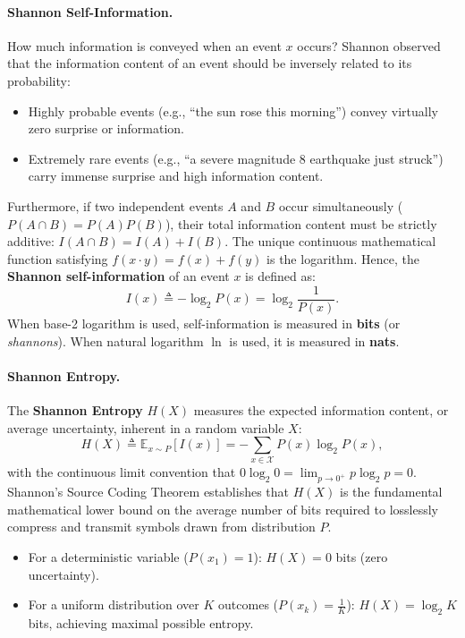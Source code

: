 \paragraph{Shannon Self-Information.}
How much information is conveyed when an event $x$ occurs? Shannon observed that the information content of an event should be inversely related to its probability:
\begin{itemize}[noitemsep]
  \item Highly probable events (e.g., ``the sun rose this morning'') convey virtually zero surprise or information.
  \item Extremely rare events (e.g., ``a severe magnitude 8 earthquake just struck'') carry immense surprise and high information content.
\end{itemize}
Furthermore, if two independent events $A$ and $B$ occur simultaneously ($P(A \cap B) = P(A)P(B)$), their total information content must be strictly additive: $I(A \cap B) = I(A) + I(B)$. The unique continuous mathematical function satisfying $f(x \cdot y) = f(x) + f(y)$ is the logarithm. Hence, the \textbf{Shannon self-information} of an event $x$ is defined as:
\begin{equation}
I(x) \triangleq -\log_2 P(x) = \log_2 \frac{1}{P(x)}.
\label{eq:self_information}
\end{equation}
When base-2 logarithm is used, self-information is measured in \textbf{bits} (or \emph{shannons}). When natural logarithm $\ln$ is used, it is measured in \textbf{nats}.

\paragraph{Shannon Entropy.}
The \textbf{Shannon Entropy} $H(X)$ measures the expected information content, or average uncertainty, inherent in a random variable $X$:
\begin{equation}
H(X) \triangleq \mathbb{E}_{x \sim P}[I(x)] = -\sum_{x \in \mathcal{X}} P(x) \log_2 P(x),
\label{eq:shannon_entropy_def}
\end{equation}
with the continuous limit convention that $0 \log_2 0 = \lim_{p \to 0^+} p \log_2 p = 0$. Shannon's Source Coding Theorem establishes that $H(X)$ is the fundamental mathematical lower bound on the average number of bits required to losslessly compress and transmit symbols drawn from distribution $P$.
\begin{itemize}[noitemsep]
  \item For a deterministic variable ($P(x_1) = 1$): $H(X) = 0$ bits (zero uncertainty).
  \item For a uniform distribution over $K$ outcomes ($P(x_k) = \frac{1}{K}$): $H(X) = \log_2 K$ bits, achieving maximal possible entropy.
\end{itemize}

